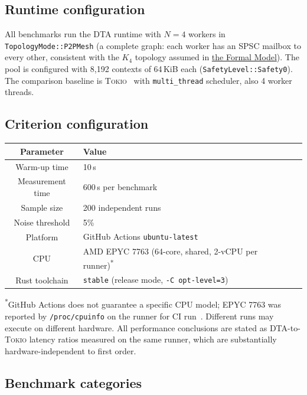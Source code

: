 \documentclass[11pt,a4paper]{article}
\newcommand{\dtact}{\textsc{DTA}}
\newcommand{\tokio}{\textsc{Tokio}}
\begin{document}
\subsection{Runtime configuration}

All benchmarks run the \dtact{} runtime with $N = 4$ workers in
\texttt{TopologyMode::P2PMesh} (a complete graph: each worker has an SPSC
mailbox to every other, consistent with the $K_4$ topology assumed in
\hyperref[chap:formal_model]{the Formal Model}).
The pool is configured with 8{,}192 contexts of 64\,KiB each
(\texttt{SafetyLevel::Safety0}).
The comparison baseline is \tokio{}~\cite{tokio} with
\texttt{multi\_thread} scheduler, also 4 worker threads.

\subsection{Criterion configuration}

\begin{center}
\begin{tabularx}{\textwidth}{@{}clXl@{}}
\toprule
Parameter & Value \\
\midrule
Warm-up time & 10\,s \\
Measurement time & 600\,s per benchmark \\
Sample size & 200 independent runs \\
Noise threshold & 5\% \\
\midrule
Platform & GitHub Actions \texttt{ubuntu-latest} \\
CPU & AMD EPYC 7763 (64-core, shared, 2-vCPU per runner)\textsuperscript{*} \\
Rust toolchain & \texttt{stable} (release mode, \texttt{-C opt-level=3}) \\
\bottomrule
\end{tabularx}
\end{center}

{\small\noindent\textsuperscript{*}GitHub Actions does not guarantee
a specific CPU model; EPYC 7763 was reported by \texttt{/proc/cpuinfo}
on the runner for CI run~\cite{dtact_ci}.
Different runs may execute on different hardware.
All performance conclusions are stated as DTA-to-\tokio{} latency ratios
measured on the same runner, which are substantially
hardware-independent to first order.}

\subsection{Benchmark categories}
\end{document}
